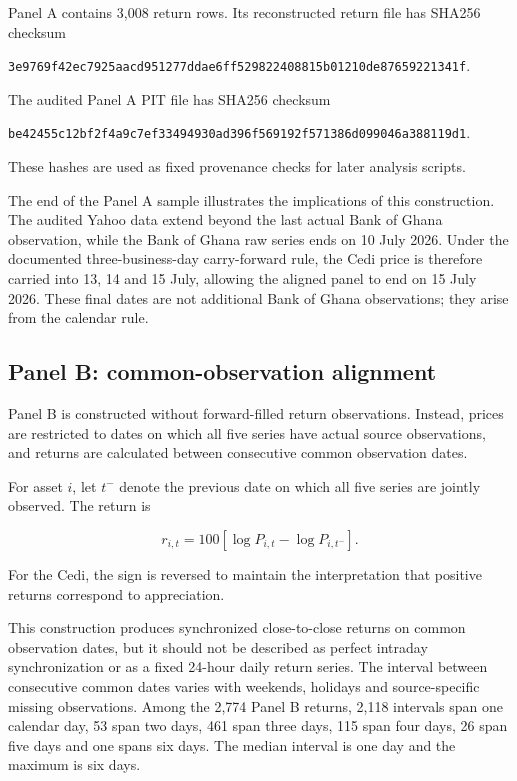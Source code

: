 Panel A contains 3,008 return rows. Its reconstructed return file has SHA256 checksum

\texttt{3e9769f42ec7925aacd951277ddae6ff529822408815b01210de87659221341f}.

The audited Panel A PIT file has SHA256 checksum

\texttt{be42455c12bf2f4a9c7ef33494930ad396f569192f571386d099046a388119d1}.

These hashes are used as fixed provenance checks for later analysis scripts.

The end of the Panel A sample illustrates the implications of this construction. The audited Yahoo data extend beyond the last actual Bank of Ghana observation, while the Bank of Ghana raw series ends on 10 July 2026. Under the documented three-business-day carry-forward rule, the Cedi price is therefore carried into 13, 14 and 15 July, allowing the aligned panel to end on 15 July 2026. These final dates are not additional Bank of Ghana observations; they arise from the calendar rule.

\subsection{Panel B: common-observation alignment}

Panel B is constructed without forward-filled return observations. Instead, prices are restricted to dates on which all five series have actual source observations, and returns are calculated between consecutive common observation dates.

For asset \(i\), let \(t^{-}\) denote the previous date on which all five series are jointly observed. The return is

\[
r_{i,t}=100\left[\log P_{i,t}-\log P_{i,t^{-}}\right].
\]

For the Cedi, the sign is reversed to maintain the interpretation that positive returns correspond to appreciation.

This construction produces synchronized close-to-close returns on common observation dates, but it should not be described as perfect intraday synchronization or as a fixed 24-hour daily return series. The interval between consecutive common dates varies with weekends, holidays and source-specific missing observations. Among the 2,774 Panel B returns, 2,118 intervals span one calendar day, 53 span two days, 461 span three days, 115 span four days, 26 span five days and one spans six days. The median interval is one day and the maximum is six days.

